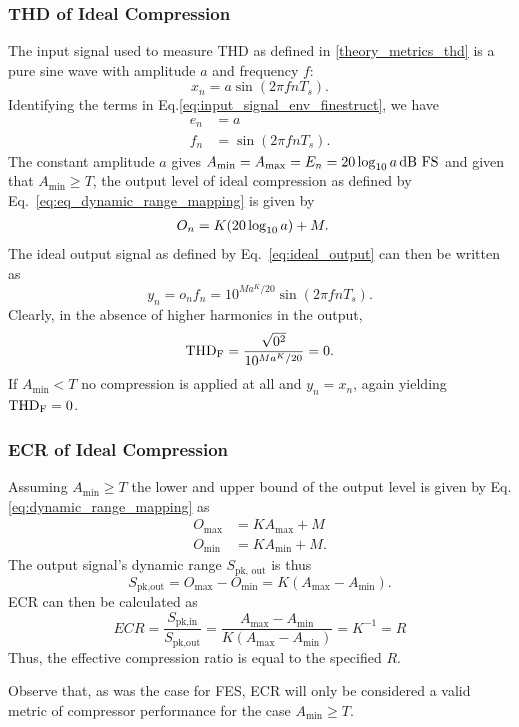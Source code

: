 \documentclass[../main2.tex]{subfiles}
\begin{document}
\subsubsection{THD of Ideal Compression}
The input signal used to measure THD as defined in \ref{theory_metrics_thd} is a pure sine wave with amplitude $a$ and frequency $f$:
\begin{equation}
x_n = a \sin( 2 \pi f n T_s ).
\end{equation}
Identifying the terms in Eq.\eqref{eq:input_signal_env_finestruct}, we have
\begin{equation}
\begin{split}
e_n &= a \\
f_n &= \sin( 2 \pi f n T_s ).
\end{split}
\end{equation}
The constant amplitude $a$ gives $A_\text{min} = A_\text{max} = E_n = 20 \log_{10} a \mskip3mu\text{dB FS}$ and given that $A_\text{min} \geq T$, the output level of ideal compression as defined by Eq.~\eqref{eq:eq_dynamic_range_mapping} is given by
\begin{equation}
\begin{split}
O_n &= K (20 \log_{10} a) + M.
\end{split}
\end{equation}
The ideal output signal as defined by Eq.~\eqref{eq:ideal_output} can then be written as
\begin{equation}
y_n = o_n f_n = 10^{Ma^K/20} \sin(2 \pi f n T_s).
\end{equation}
Clearly, in the absence of higher harmonics in the output,
\begin{equation}
\text{THD}_\text{F} = \frac{\sqrt{0^2}}{10^{Ma^K/20}} = 0.
\end{equation}
If $A_\text{min} < T$ no compression is applied at all and $y_n = x_n$, again yielding $\text{THD}_\text{F} = 0$.

\subsubsection{ECR of Ideal Compression}
Assuming $A_\text{min} \geq T$ the lower and upper bound of the output level is given by Eq.\eqref{eq:dynamic_range_mapping} as
\begin{equation}
\begin{split}
O_\text{max} &= K A_\text{max} + M\\
O_\text{min} &= K A_\text{min} + M.
\end{split}
\end{equation}
The output signal's dynamic range $S_\text{pk, out}$ is thus
\begin{equation}
S_\text{pk,out} = O_\text{max} - O_\text{min} = K (A_\text{max} - A_\text{min}).\end{equation}
ECR can then be calculated as
\begin{equation}
ECR = \frac{S_\text{pk,in}}{S_\text{pk,out}} = \frac{A_\text{max} - A_\text{min}}{K(A_\text{max} - A_\text{min})} = K^{-1} = R
\end{equation}
Thus, the effective compression ratio is equal to the specified $R$.

Observe that, as was the case for FES, ECR will only be considered a valid metric of compressor performance for the case $A_\text{min} \geq T$.
\end{document}
